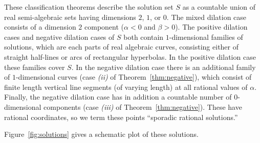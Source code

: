 \documentclass[11pt, letterpaper, reqno]{amsart}
\theoremstyle{definition}
\numberwithin{equation}{section}
\begin{document}
 
These  classification theorems describe 
the solution set $S$ %
as a countable union of  real semi-algebraic sets  having dimensions $2$, $1$, or $0$. 
The mixed dilation case  consists of  a dimension $2$ component
($\alpha<0$ and $\beta>0$).  
The positive  dilation cases and negative dilation cases of $S$ both  contain
 $1$-dimensional families of solutions, which 
are each parts of real algebraic curves, consisting either
of straight half-lines or  arcs of rectangular hyperbolas. 
In the positive dilation case these families cover $S$. 
In the negative dilation case there is an additional family  
of $1$-dimensional curves (case {\em(ii)} of Theorem~\ref{thm:negative}), 
which consist of finite length vertical line segments 
(of varying length) at all rational values of $\alpha$.
Finally, the  negative dilation case has  in addition   
a countable number of $0$-dimensional components (case {\em(iii)} of Theorem~\ref{thm:negative}).
These have rational coordinates, so we term  these points ``sporadic rational solutions.''

Figure~\ref{fig:solutions} gives a schematic 
plot of these solutions. 
\end{document}
